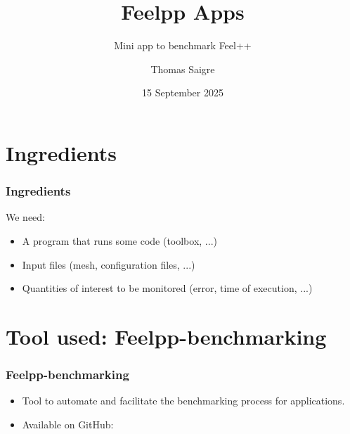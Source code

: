 \documentclass[aspectratio=169]{beamer}
\title{Feelpp Apps}
\subtitle{Mini app to benchmark Feel++}
\date{15 September 2025}
\author{Thomas Saigre}
\institute{Cemosis, Université de Strasbourg}
\begin{document}
\maketitle


\section{Ingredients}

\begin{frame}
  \frametitle{Ingredients}

  We need:

  \begin{itemize}
    \item A program that runs some code (toolbox, ...)
    \item Input files (mesh, configuration files, ...)
    \item Quantities of interest to be monitored (error, time of execution, ...)
  \end{itemize}

\end{frame}


\section{Tool used: Feelpp-benchmarking}

\begin{frame}
  \frametitle{Feelpp-benchmarking}

  \begin{itemize}
    \item Tool to automate and facilitate the benchmarking process for applications.
    \item Available on GitHub: 
  \end{itemize}

\end{frame}
\end{document}
